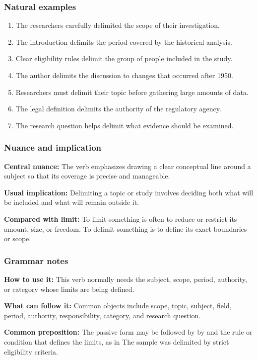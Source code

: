 \documentclass[11pt]{article}
\begin{document}
\subsubsection{Natural examples}
\begin{enumerate}
  \item The researchers carefully delimited the scope of their investigation.
  \item The introduction delimits the period covered by the historical analysis.
  \item Clear eligibility rules delimit the group of people included in the study.
  \item The author delimits the discussion to changes that occurred after 1950.
  \item Researchers must delimit their topic before gathering large amounts of data.
  \item The legal definition delimits the authority of the regulatory agency.
  \item The research question helps delimit what evidence should be examined.
\end{enumerate}

\subsubsection{Nuance and implication}
\textbf{Central nuance:} The verb emphasizes drawing a clear conceptual line around a subject so that its coverage is precise and manageable.

\textbf{Usual implication:} Delimiting a topic or study involves deciding both what will be included and what will remain outside it.

\textbf{Compared with limit:} To limit something is often to reduce or restrict its amount, size, or freedom. To delimit something is to define its exact boundaries or scope.

\subsubsection{Grammar notes}
\textbf{How to use it:} This verb normally needs the subject, scope, period, authority, or category whose limits are being defined.

\textbf{What can follow it:} Common objects include scope, topic, subject, field, period, authority, responsibility, category, and research question.

\textbf{Common preposition:} The passive form may be followed by by and the rule or condition that defines the limits, as in The sample was delimited by strict eligibility criteria.
\end{document}
